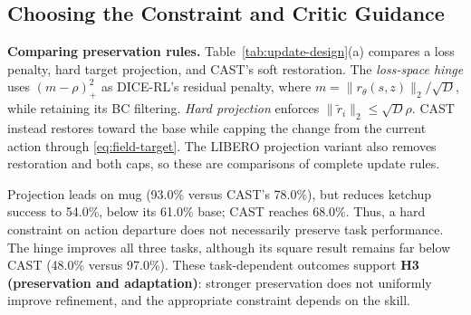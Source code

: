 


\subsection{Choosing the Constraint and Critic Guidance}
\label{sec:exp-design}


\textbf{Comparing preservation rules.}
Table~\ref{tab:update-design}(a) compares a loss penalty, hard target projection, and CAST's soft restoration. The \emph{loss-space hinge} uses $(m-\rho)_+^2$ as DICE-RL's residual penalty, where $m=\|r_\theta(s,z)\|_2/\sqrt{D}$, while retaining its BC filtering. \emph{Hard projection} enforces $\|\tilde r_i\|_2\leq\sqrt{D}\rho$. CAST instead restores toward the base while capping the change from the current action through \eqref{eq:field-target}. The LIBERO projection variant also removes restoration and both caps, so these are comparisons of complete update rules.

Projection leads on mug (93.0\% versus CAST's 78.0\%), but reduces ketchup success to 54.0\%, below its 61.0\% base; CAST reaches 68.0\%. Thus, a hard constraint on action departure does not necessarily preserve task performance. The hinge improves all three tasks, although its square result remains far below CAST (48.0\% versus 97.0\%). These task-dependent outcomes support \textbf{H3  (preservation and adaptation)}: stronger preservation does not uniformly improve refinement, and the appropriate constraint depends on the skill.

